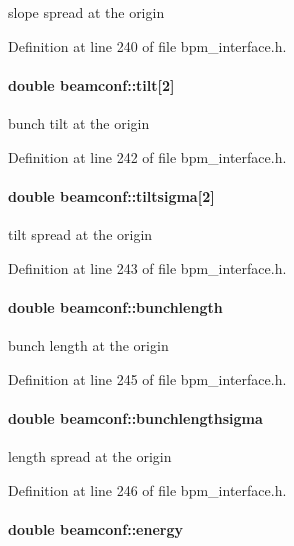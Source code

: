slope spread at the origin 

Definition at line 240 of file bpm\_\-interface.h.
\paragraph[tilt]{\setlength{\rightskip}{0pt plus 5cm}double {\bf beamconf::tilt}[2]}\hfill\label{structbeamconf_7465dd8acdcfce91e185a075334e2300}


bunch tilt at the origin 

Definition at line 242 of file bpm\_\-interface.h.
\paragraph[tiltsigma]{\setlength{\rightskip}{0pt plus 5cm}double {\bf beamconf::tiltsigma}[2]}\hfill\label{structbeamconf_64040fb7876b2b4b8969154ab4aa387d}


tilt spread at the origin 

Definition at line 243 of file bpm\_\-interface.h.
\paragraph[bunchlength]{\setlength{\rightskip}{0pt plus 5cm}double {\bf beamconf::bunchlength}}\hfill\label{structbeamconf_77503373031b8d15c31f697e8b8f5257}


bunch length at the origin 

Definition at line 245 of file bpm\_\-interface.h.
\paragraph[bunchlengthsigma]{\setlength{\rightskip}{0pt plus 5cm}double {\bf beamconf::bunchlengthsigma}}\hfill\label{structbeamconf_166c8fdd8f3720c15faa4ba77b234d2c}


length spread at the origin 

Definition at line 246 of file bpm\_\-interface.h.
\paragraph[energy]{\setlength{\rightskip}{0pt plus 5cm}double {\bf beamconf::energy}}\hfill\label{structbeamconf_259020346afa58ec8360e5098e8d9ab4}


